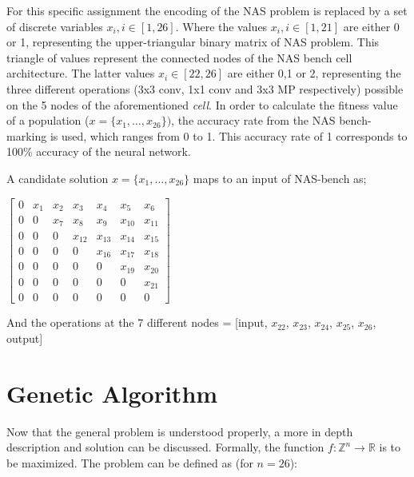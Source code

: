 \documentclass{article}
\begin{document}
For this specific assignment the encoding of the NAS problem is replaced by a set of discrete variables $x_i, i \in [1, 26]$.
Where the values $x_i, i \in [1, 21]$ are either 0 or 1, representing the upper-triangular binary matrix of NAS problem.
This triangle of values represent the connected nodes of the NAS bench cell architecture.
The latter values $x_i \in [22,26]$ are either 0,1 or 2, representing the three different operations (3x3 conv, 1x1 conv and 3x3 MP respectively) possible on the 5 nodes of the aforementioned \textit{cell}.
In order to calculate the fitness value of a population ($x = \{x_1, \dots, x_26\})$, the accuracy rate from the NAS bench-marking is used, which ranges from 0 to 1.
This accuracy rate of 1 corresponds to 100\% accuracy of the neural network.

A candidate solution $x = \{x_1, \dots , x_{26}\}$ maps to an input of NAS-bench as; 

$ \begin{bmatrix}
0 & x_1 & x_2 & x_3    & x_4    & x_5    & x_6    \\
0 & 0   & x_7 & x_8    & x_9    & x_{10} & x_{11} \\
0 & 0   & 0   & x_{12} & x_{13} & x_{14} & x_{15} \\
0 & 0   & 0   & 0      & x_{16} & x_{17} & x_{18} \\
0 & 0   & 0   & 0      & 0      & x_{19} & x_{20} \\
0 & 0   & 0   & 0      & 0      & 0      & x_{21} \\
0 & 0   & 0   & 0      & 0      & 0      & 0 
\end{bmatrix}  $

And the operations at the 7 different nodes = [input, $x_{22}$, $x_{23}$, $x_{24}$, $x_{25}$, $x_{26}$, output]



\section{Genetic Algorithm}
\label{sec:GA}

Now that the general problem is understood properly, a more in depth description and solution can be discussed.
Formally, the function $f: \mathbb{Z}^n \rightarrow \mathbb{R}$ is to be maximized.
The problem can be defined as (for $n=26$):
\end{document}
